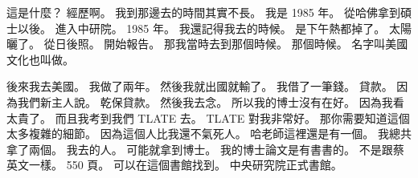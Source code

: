 \hypertarget{c01:cue:3782}{}這是什麼？
\hypertarget{c01:cue:3783}{}經歷啊。
\hypertarget{c01:cue:3784}{}我到那邊去的時間其實不長。
\hypertarget{c01:cue:3785}{}我是 1985 年。
\hypertarget{c01:cue:3786}{}從哈佛拿到碩士以後。
\hypertarget{c01:cue:3787}{}進入中研院。
\hypertarget{c01:cue:3788}{}1985 年。
\hypertarget{c01:cue:3789}{}我還記得我去的時候。
\hypertarget{c01:cue:3790}{}是下午熱都掉了。
\hypertarget{c01:cue:3791}{}太陽曬了。
\hypertarget{c01:cue:3792}{}從日後照。
\hypertarget{c01:cue:3793}{}開始報告。
\hypertarget{c01:cue:3794}{}那我當時去到那個時候。
\hypertarget{c01:cue:3795}{}那個時候。
\hypertarget{c01:cue:3796}{}名字叫美國文化也叫做。

\hypertarget{c01:cue:3797}{}後來我去美國。
\hypertarget{c01:cue:3798}{}我做了兩年。
\hypertarget{c01:cue:3799}{}然後我就出國就輸了。
\hypertarget{c01:cue:3800}{}我借了一筆錢。
\hypertarget{c01:cue:3801}{}貸款。
\hypertarget{c01:cue:3802}{}因為我們新主人說。
\hypertarget{c01:cue:3803}{}乾保貸款。
\hypertarget{c01:cue:3804}{}然後我去念。
\hypertarget{c01:cue:3805}{}所以我的博士沒有在好。
\hypertarget{c01:cue:3806}{}因為我看太貴了。
\hypertarget{c01:cue:3807}{}而且我考到我們 TLATE 去。
\hypertarget{c01:cue:3808}{}TLATE 對我非常好。
\hypertarget{c01:cue:3809}{}那你需要知道這個太多複雜的細節。
\hypertarget{c01:cue:3810}{}因為這個人比我還不氣死人。
\hypertarget{c01:cue:3811}{}哈老師這裡還是有一個。
\hypertarget{c01:cue:3812}{}我總共拿了兩個。
\hypertarget{c01:cue:3813}{}我去的人。
\hypertarget{c01:cue:3814}{}可能就拿到博士。
\hypertarget{c01:cue:3815}{}我的博士論文是有書書的。
\hypertarget{c01:cue:3816}{}不是跟蔡英文一樣。
\hypertarget{c01:cue:3817}{}550 頁。
\hypertarget{c01:cue:3818}{}可以在這個書館找到。
\hypertarget{c01:cue:3819}{}中央研究院正式書館。

